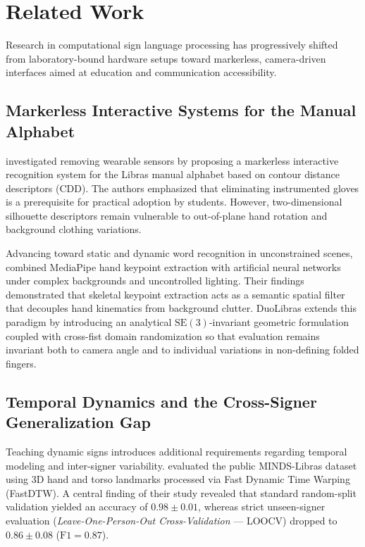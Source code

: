 \documentclass[12pt,a4paper]{article}
\newcommand{\citeonline}[1]{\citet{#1}}
\begin{document}

\section{Related Work}
\label{sec:related_work}

Research in computational sign language processing has progressively shifted from laboratory-bound hardware setups toward markerless, camera-driven interfaces aimed at education and communication accessibility.

\subsection{Markerless Interactive Systems for the Manual Alphabet}

\citeonline{furtado2023markerless} investigated removing wearable sensors by proposing a markerless interactive recognition system for the Libras manual alphabet based on contour distance descriptors (CDD). The authors emphasized that eliminating instrumented gloves is a prerequisite for practical adoption by students. However, two-dimensional silhouette descriptors remain vulnerable to out-of-plane hand rotation and background clothing variations.

Advancing toward static and dynamic word recognition in unconstrained scenes, \citeonline{feliciano2023complex} combined MediaPipe hand keypoint extraction with artificial neural networks under complex backgrounds and uncontrolled lighting. Their findings demonstrated that skeletal keypoint extraction acts as a semantic spatial filter that decouples hand kinematics from background clutter. DuoLibras extends this paradigm by introducing an analytical $\text{SE}(3)$-invariant geometric formulation coupled with cross-fist domain randomization so that evaluation remains invariant both to camera angle and to individual variations in non-defining folded fingers.

\subsection{Temporal Dynamics and the Cross-Signer Generalization Gap}

Teaching dynamic signs introduces additional requirements regarding temporal modeling and inter-signer variability. \citeonline{arcanjo2024dtw} evaluated the public MINDS-Libras dataset using 3D hand and torso landmarks processed via Fast Dynamic Time Warping (FastDTW). A central finding of their study revealed that standard random-split validation yielded an accuracy of $0.98 \pm 0.01$, whereas strict unseen-signer evaluation (\textit{Leave-One-Person-Out Cross-Validation} --- LOOCV) dropped to $0.86 \pm 0.08$ ($\text{F1} = 0.87$).
\end{document}
